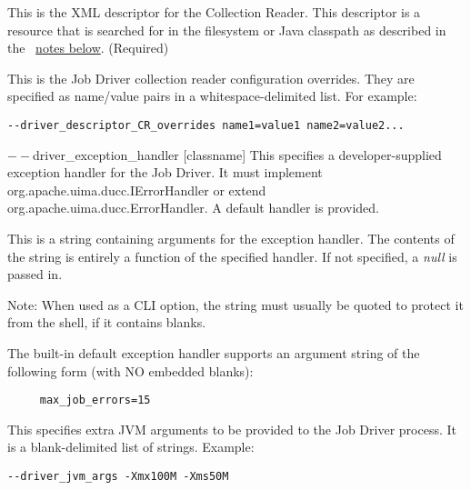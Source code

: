 \begin{description}
           \item[$--$driver\_descriptor\_CR {[descriptor.xml]} ] This is the XML descriptor for the
             Collection Reader.  This 
             descriptor is a resource that is searched for in the filesystem or Java classpath as described 
             in the ~\hyperref[par:cli.submit.notes]{notes below}. (Required)

           \item[$--$driver\_descriptor\_CR\_overrides {[list]} ]             
             This is the Job Driver collection reader configuration overrides. They are specified as 
             name/value pairs in a whitespace-delimited list. For example: 
             \begin{verbatim}
--driver_descriptor_CR_overrides name1=value1 name2=value2...
             \end{verbatim}
             
           \begin{sloppypar}
           \item[$--$driver\_exception\_handler {[classname]}] This specifies a developer-supplied
             exception handler for the Job Driver.  It must
             implement org.apache.uima.ducc.IErrorHandler or extend
             org.apache.uima.ducc.ErrorHandler.  A default handler is provided.
           \end{sloppypar}
           
           \item[$--$driver\_exception\_handler\_arguments {[argument-string]}] This is a string
             containing arguments for the exception handler.  The contents of
             the string is entirely a function of the specified handler.  If not specified,
             a {\em null} is passed in.

             Note: When used as a CLI option, the string must usually be
             quoted to protect it from the shell, if it contains blanks.

             The built-in default exception handler supports an argument string of the following form
             (with NO embedded blanks):
\begin{verbatim}
     max_job_errors=15
\end{verbatim}

           \item[$--$driver\_jvm\_args {[list]} ]

             This specifies extra JVM arguments to be provided to the Job Driver process. It is a blank-delimited 
             list of strings. Example: 
             \begin{verbatim}
--driver_jvm_args -Xmx100M -Xms50M 
             \end{verbatim}


\end{description}
